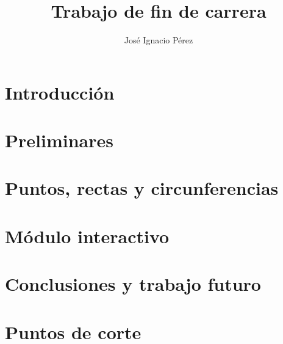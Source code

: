 \documentclass[12pt,a4paper,draft]{book}
\author{Jos\'e Ignacio P\'erez}
\title{Trabajo de fin de carrera}
\begin{document}
\newcommand{\codesize}{\small}

%
\frontmatter
\tableofcontents

\mainmatter
\chapter{Introducción}\label{ch:intro}

\chapter{Preliminares}\label{cap.2}

\chapter{Puntos, rectas y circunferencias}\label{cap.3}

\chapter{Módulo interactivo}\label{cap.4}

\chapter{Conclusiones y trabajo futuro}\label{cap.5}

\appendix
\chapter{Puntos de corte}

\backmatter

\end{document}
